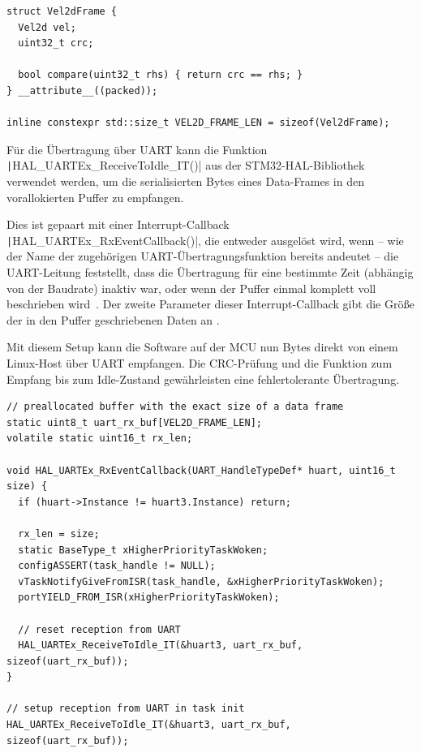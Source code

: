 \begin{code}
\begin{verbatim}
struct Vel2dFrame {
  Vel2d vel;
  uint32_t crc;

  bool compare(uint32_t rhs) { return crc == rhs; }
} __attribute__((packed));

inline constexpr std::size_t VEL2D_FRAME_LEN = sizeof(Vel2dFrame);
\end{verbatim}
\end{code}

Für die Übertragung über UART kann die Funktion
\texttt|HAL_UARTEx_ReceiveToIdle_IT()| aus der STM32-HAL-Bibliothek
verwendet werden, um die serialisierten Bytes eines Data-Frames in den
vorallokierten Puffer zu empfangen.

Dies ist gepaart mit einer Interrupt-Callback
\texttt|HAL_UARTEx_RxEventCallback()|, die entweder ausgelöst wird,
wenn -- wie der Name der zugehörigen UART-Übertragungsfunktion bereits andeutet
-- die UART-Leitung feststellt, dass die Übertragung für eine bestimmte Zeit
(abhängig von der Baudrate) inaktiv war, oder wenn der Puffer einmal komplett
voll beschrieben wird~\cite{HAL_UARTEx_ReceiveToIdle_IT}. Der zweite Parameter
dieser Interrupt-Callback gibt die Größe der in den Puffer geschriebenen Daten
an \cite{HAL_UARTEx_RxEventCallback}.

Mit diesem Setup kann die Software auf der MCU nun Bytes direkt von einem
Linux-Host über UART empfangen. Die CRC-Prüfung und die Funktion zum Empfang bis
zum Idle-Zustand gewährleisten eine fehlertolerante Übertragung.

\begin{code}
\begin{verbatim}
// preallocated buffer with the exact size of a data frame
static uint8_t uart_rx_buf[VEL2D_FRAME_LEN];
volatile static uint16_t rx_len;

void HAL_UARTEx_RxEventCallback(UART_HandleTypeDef* huart, uint16_t size) {
  if (huart->Instance != huart3.Instance) return;

  rx_len = size;
  static BaseType_t xHigherPriorityTaskWoken;
  configASSERT(task_handle != NULL);
  vTaskNotifyGiveFromISR(task_handle, &xHigherPriorityTaskWoken);
  portYIELD_FROM_ISR(xHigherPriorityTaskWoken);

  // reset reception from UART
  HAL_UARTEx_ReceiveToIdle_IT(&huart3, uart_rx_buf, sizeof(uart_rx_buf));
}

// setup reception from UART in task init
HAL_UARTEx_ReceiveToIdle_IT(&huart3, uart_rx_buf, sizeof(uart_rx_buf));
\end{verbatim}
\end{code}

